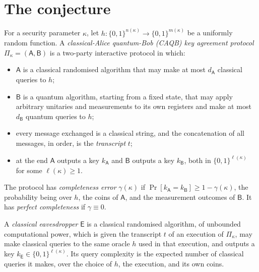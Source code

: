 \documentclass{aicr-conjecture}
\begin{document}
\section{The conjecture}\label{sec:conjectures}

\begin{definition}\label{def:caqb}
For a security parameter $\kappa$, let
$h \colon \{0,1\}^{n(\kappa)} \to \{0,1\}^{m(\kappa)}$ be a uniformly
random function. A \emph{classical-Alice quantum-Bob (CAQB) key
agreement protocol} $\Pi_\kappa = (\mathsf{A}, \mathsf{B})$ is a
two-party interactive protocol in which:
\begin{itemize}
  \item $\mathsf{A}$ is a classical randomised algorithm that may make
    at most $d_{\mathsf{A}}$ classical queries to $h$;
  \item $\mathsf{B}$ is a quantum algorithm, starting from a fixed
    state, that may apply arbitrary unitaries and measurements to its
    own registers and make at most $d_{\mathsf{B}}$ quantum queries to
    $h$;
  \item every message exchanged is a classical string, and the
    concatenation of all messages, in order, is the \emph{transcript}
    $t$;
  \item at the end $\mathsf{A}$ outputs a key $k_{\mathsf{A}}$ and
    $\mathsf{B}$ outputs a key $k_{\mathsf{B}}$, both in
    $\{0,1\}^{\ell(\kappa)}$ for some $\ell(\kappa) \ge 1$.
\end{itemize}
The protocol has \emph{completeness error} $\gamma(\kappa)$ if
$\Pr[k_{\mathsf{A}} = k_{\mathsf{B}}] \ge 1 - \gamma(\kappa)$, the
probability being over $h$, the coins of $\mathsf{A}$, and the
measurement outcomes of $\mathsf{B}$. It has \emph{perfect
completeness} if $\gamma \equiv 0$.
\end{definition}

\begin{definition}\label{def:eve}
A \emph{classical eavesdropper} $\mathsf{E}$ is a classical randomised
algorithm, of unbounded computational power, which is given the
transcript $t$ of an execution of $\Pi_\kappa$, may make classical
queries to the same oracle $h$ used in that execution, and outputs a key
$k_{\mathsf{E}} \in \{0,1\}^{\ell(\kappa)}$. Its query complexity is the
expected number of classical queries it makes, over the choice of $h$,
the execution, and its own coins.
\end{definition}
\end{document}
